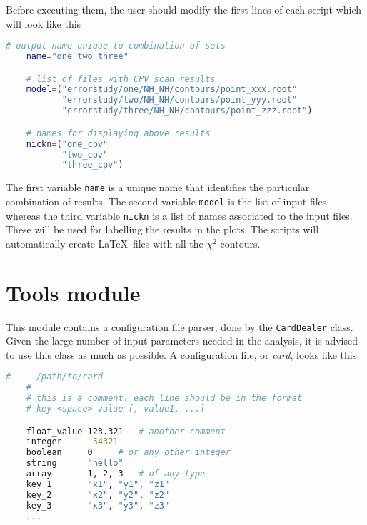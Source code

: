 \documentclass[a4paper, 11pt]{article}
\begin{document}
Before executing them, the user should modify the first lines of each script which will look like this
\begin{lstlisting}[language=bash]
	# output name unique to combination of sets
	name="one_two_three"

	# list of files with CPV scan results
	model=("errorstudy/one/NH_NH/contours/point_xxx.root"
	       "errorstudy/two/NH_NH/contours/point_yyy.root"
	       "errorstudy/three/NH_NH/contours/point_zzz.root")

	# names for displaying above results
	nickn=("one_cpv"
	       "two_cpv"
	       "three_cpv")
\end{lstlisting}
The first variable \texttt{name} is a unique name that identifies the particular combination of results.
The second variable \texttt{model} is the list of input files, whereas the third variable \texttt{nickn} %
is a list of names associated to the input files.
These will be used for labelling the results in the plots.
The scripts will automatically create \LaTeX\ files with all the $\chi^2$ contours. 


\section{Tools module}

This module contains a configuration file parser, done by the \texttt{CardDealer} class.
Given the large number of input parameters needed in the analysis, it is advised to use this class as much as possible.
A configuration file, or \emph{card}, looks like this
\begin{lstlisting}[language=bash]
	# --- /path/to/card ---
	#
	# this is a comment. each line should be in the format
	# key <space> value [, value1, ...]

	float_value	123.321	  # another comment
	integer		-54321
	boolean		0	  # or any other integer
	string		"hello"
	array		1, 2, 3	  # of any type
	key_1		"x1", "y1", "z1"
	key_2		"x2", "y2", "z2"
	key_3		"x3", "y3", "z3"
	...
\end{lstlisting}
\end{document}
